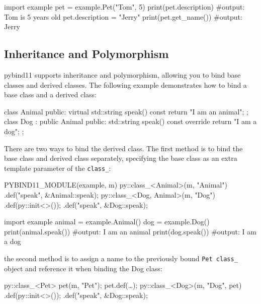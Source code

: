 \begin{codeblock}[language=python]
import example
pet = example.Pet("Tom", 5)
print(pet.description) #output: Tom is 5 years old
pet.description = "Jerry"
print(pet.get_name()) #output: Jerry
\end{codeblock}

\subsection{Inheritance and Polymorphism}

pybind11 supports inheritance and polymorphism, allowing you to bind base classes and derived classes. The following example demonstrates how to bind a base class and a derived class:

\begin{codeblock}[language=C++]
class Animal {
public:
    virtual std::string speak() const {
        return "I am an animal";
    }
};
class Dog : public Animal {
public:
    std::string speak() const override {
        return "I am a dog";
    }
};
\end{codeblock}

There are two ways to bind the derived class. The first method is to bind the base class and derived class separately, specifying the base class as an extra template parameter of the \texttt{class\_}:

\begin{codeblock}[language=C++]
PYBIND11_MODULE(example, m) {
    py::class_<Animal>(m, "Animal")
        .def("speak", &Animal::speak);
    py::class_<Dog, Animal>(m, "Dog")
        .def(py::init<>());
        .def("speak", &Dog::speak);
}
\end{codeblock}

\begin{codeblock}[language=python]
import example
animal = example.Animal()
dog = example.Dog()
print(animal.speak()) #output: I am an animal
print(dog.speak()) #output: I am a dog
\end{codeblock}

the second method is to assign a name to the previously bound \texttt{Pet class\_} object and reference it when binding the Dog class:

\begin{codeblock}[language=C++]
py::class_<Pet> pet(m, "Pet");
pet.def(\dots);
py::class_<Dog>(m, "Dog", pet)
    .def(py::init<>());
    .def("speak", &Dog::speak);
\end{codeblock}

